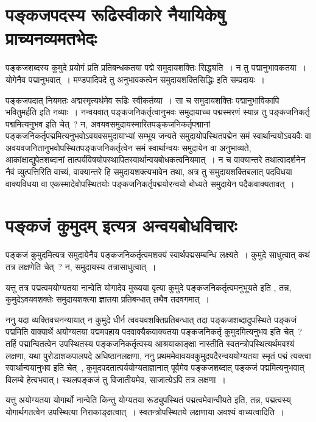	\section{पङ्कजपदस्य रूढिस्वीकारे नैयायिकेषु प्राच्यनव्यमतभेदः}
	
		पङ्कजशब्दस्य कुमुदे प्रयोगं प्रति प्रतिबन्धकतया पद्मे समुदायशक्तिः सिद्ध्यति~। न तु पद्मानुभावकतया~। योगेनैव पद्मानुभवात्~। मण्डपादिपदे तु अनुभावकत्वेन समुदायशक्तिसिद्धिः इति सम्प्रदायः~। 
		
		पङ्कजपदात् नियमतः अद्मस्मृत्यर्थमेव रूढिः स्वीकर्तव्या~। सा च समुदायशक्तिः पद्मानुभाविकापि भवितुमर्हति इति नव्याः~। नन्वयवात् पङ्कजनिकर्तृत्वानुभवः समुदायाच्च पद्मस्मरणं  स्यान्न तु पङ्कजनिकर्तृ पद्ममित्यनुभव  इति चेत्~? न, अवयवसमुदायस्मारितपङ्कजनिकर्तृपद्मानां  पङ्कजनिकर्तृपद्ममित्यनुभवोऽवयवसमुदायाभ्यां सम्भूय जन्यते समुदायोपस्थितपद्मेन समं स्वार्थान्वयोऽवयवैः वा  अवयवजनितानुभवोपस्थितपङ्कजनिकर्तृत्वेन समं स्वार्थान्वयः समुदायेन वा अनुभाव्यते, आकांक्षाद्युपेतशब्दानां  तात्पर्यविषयोपस्थापितस्वार्थान्वयबोधकत्वनियमात्~। न च वाक्यान्तरे  तथात्वादर्शनेन नैवं व्युत्पत्तिरिति वाच्यं, वाक्यान्तरे हि समुदायशक्त्यभावेन तथा, अत्र तु समुदायशक्तिबलात् पदविधया वाक्यविधया वा एकस्मादेवोपस्थितयोः पङ्कजनिकर्तृपद्मयोरन्वयो बोध्यते  समुदायेन पदैकवाक्यतावत्~।
		
	\section{पङ्कजं कुमुदम् इत्यत्र अन्वयबोधविचारः}
	
		पङ्कजं कुमुदमित्यत्र समुदायेनैव पङ्कजनिकर्तृत्वमशक्यं स्वार्थपद्मसम्बन्धि लक्ष्यते~। कुमुदे साधुत्वात् कथं तत्र लक्षणेति चेत्~? न, समुदायस्य तत्रासाधुत्वात्~।
  
		यत्तु तत्र पद्मत्वमयोग्यतया नान्वेति योगादेव मुख्यया वृत्या कुमुदे पङ्कजनिकर्तृत्वमनुभूयते इति , तन्न, कुमुदेऽवयवशक्तेः समुदायशक्त्या ज्ञातया  प्रतिबन्धात् तथैव तदवगमात्~।
		
		ननु यदा व्यक्तिवचनन्यायात् न कुमुदे धीर्न त्ववयवशक्तिप्रतिबन्धात् तदा पङ्कजशब्दादुपस्थिते पङ्कजं पद्ममिति वाक्यार्थे अयोग्यतया पद्ममपहाय पदवाक्यैकवाक्यतया पङ्कजनिकर्तृ  कुमुदमित्यनुभव इति चेत्~? तर्हि पद्मान्वितत्वेन उपस्थितस्य  पङ्कजनिकर्तृत्वस्य आश्रयाकाङ्क्षा नास्तीति स्वतन्त्रोपस्थित्यर्थमवश्यं  लक्षणा,  यथा पुरोडाशकपालपदे अधिष्ठानलक्षणा, ननु प्रथममेवावयवकुमुदपदैरन्वययोग्यतया स्मृतं पद्मं त्यक्त्वा स्वार्थान्वयानुभव इति चेत्~, कुमुदपदतात्पर्ययोग्यताज्ञानात् पूर्वमेव पङ्कजशब्दात् पङ्कजं पद्ममित्यनुभवात् विलम्बे हेत्वभवात्। स्थलपङ्कजं तु विजातीयमेव, साजात्येऽपि तत्र लक्षणा~।
  
		यत्तु अयोग्यतया योगार्थो नान्वेति किन्तु योग्यतया रूड्युपस्थितं पद्मत्वमेवान्वीयते इति, तन्न, पद्मत्वस्य् योगार्थगतत्वेन उपस्थित्या निराकाङ्क्षत्वात्~। स्वतन्त्रोपस्थितये लक्षणाया अवश्यं वाच्यत्वादिति~।

